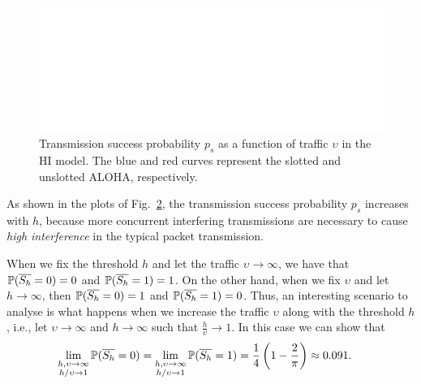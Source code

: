 \begin{figure}[htb]
\begin{subfigure}{.45\textwidth}
        \label{fig:HI_1}
        \end{subfigure}
    \else
        \includegraphics[draft, width=\textwidth]{Figures/placeholder.png}
    \fi
    \caption{Transmission success probability $p_s$ as a function of traffic $\upsilon$ in the HI model. The blue and red curves represent the slotted and unslotted ALOHA, respectively.} \label{fig:HI}
\end{figure}

As shown in the plots of Fig.~\ref{fig:HI}, the transmission success probability $p_s$ increases with $h$, because more concurrent interfering transmissions are necessary to cause \textit{high interference} in the typical packet transmission.

When we fix the threshold $h$ and let the traffic $\upsilon\to\infty$, we have that ${\P(\overline{S_h}=0)=0}$ and $\P(\overline{S_h}=1)=1$.
%
On the other hand, when we fix $\upsilon$ and let $h\to\infty$, then ${\P(\overline{S_h}=0)=1}$ and $\P(\overline{S_h}=1)=0$.
%
Thus, an interesting scenario to analyse is what happens when we increase the traffic $\upsilon$ along with the threshold $h$, i.e., let $\upsilon\to\infty$ and $h\to\infty$ such that $\frac{h}{\upsilon} \to 1$.
%
In this case we can show that
\begin{align*}
   \lim_{\substack{h,\upsilon\to\infty\\ h/\upsilon\to1}} \P(\overline{S_h} = 0) &=  \lim_{\substack{h,\upsilon\to\infty\\ h/\upsilon\to1}} \P(\overline{S_h} = 1) = \frac{1}{4}\left( 1 - \frac{2}{\pi}\right) \approx 0.091.
\end{align*}

